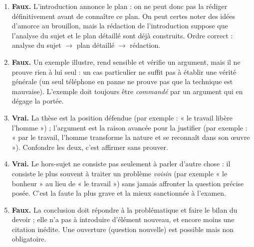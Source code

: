 \documentclass[11pt]{article}
\begin{document}
\begin{corrige}
\begin{enumerate}
\item \textbf{Faux.} L'introduction annonce le plan : on ne peut donc pas la rédiger définitivement avant de connaître ce plan. On peut certes noter des idées d'amorce au brouillon, mais la rédaction de l'introduction suppose que l'analyse du sujet et le plan détaillé sont déjà construits. Ordre correct : analyse du sujet $\rightarrow$ plan détaillé $\rightarrow$ rédaction.
\item \textbf{Faux.} Un exemple illustre, rend sensible et vérifie un argument, mais il ne prouve rien à lui seul : un cas particulier ne suffit pas à établir une vérité générale (un seul téléphone en panne ne prouve pas que la technique est mauvaise). L'exemple doit toujours être \emph{commandé} par un argument qui en dégage la portée.
\item \textbf{Vrai.} La thèse est la position défendue (par exemple : « le travail libère l'homme ») ; l'argument est la raison avancée pour la justifier (par exemple : « par le travail, l'homme transforme la nature et se reconnaît dans son œuvre »). Confondre les deux, c'est affirmer sans prouver.
\item \textbf{Vrai.} Le hors-sujet ne consiste pas seulement à parler d'autre chose : il consiste le plus souvent à traiter un problème \emph{voisin} (par exemple « le bonheur » au lieu de « le travail ») sans jamais affronter la question précise posée. C'est la faute la plus grave et la mieux sanctionnée à l'examen.
\item \textbf{Faux.} La conclusion doit répondre à la problématique et faire le bilan du devoir ; elle n'a pas à introduire d'élément nouveau, et encore moins une citation inédite. Une ouverture (question nouvelle) est possible mais non obligatoire.
\end{enumerate}
\end{corrige}
\end{document}
